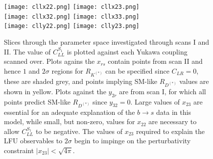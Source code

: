 \begin{figure}
    \texttt{[image: cllx22.png]} \hfill
    \texttt{[image: cllx23.png]}\\
    \texttt{[image: cllx32.png]} \hfill
    \texttt{[image: cllx33.png]} \\
    \texttt{[image: clly22.png]} \hfill
    \texttt{[image: clly23.png]}
    \caption[Slices through the parameter space investigated through scans I and
    II.]{Slices through the parameter space investigated through scans I and II.
      The value of $C_{LL}^{S_{1}}$ is plotted against each Yukawa coupling scanned
      over. Plots agains the $x_{rs}$ contain points from scan II and hence $1$
      and $2\sigma$ regions for $R_{K^{(*)}}$ can be specified since
      $C_{LR} = 0$, these are shaded grey, and points implying SM-like
      $R_{D^{(*)}}$ values are shown in yellow. Plots against the $y_{2r}$ are
      from scan I, for which all points predict SM-like $R_{D^{(*)}}$ since
      $y_{32} = 0$. Large values of $x_{23}$ are essential for an adequate
      explanation of the $b \to s$ data in this model, while small, but
      non-zero, values for $x_{22}$ are necessary to allow $C_{LL}^{S_{1}}$ to be
      negative. The values of $x_{23}$ required to explain the LFU observables
      to $2\sigma$ begin to impinge on the perturbativity constraint
      $|x_{23}| < \sqrt{4\pi}$.}
  \label{fig:ch3-rkscans}
\end{figure}

